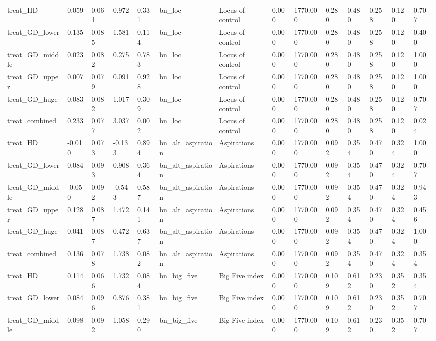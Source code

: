 \begin{tabular}{llllllllllllll}
treat\_HD & 0.059 & 0.061 & 0.972 & 0.331 & bn\_loc & Locus of control & 0.000 & 1770.000 & 0.280 & 0.480 & 0.258 & 0.120 & 0.707 \\
treat\_GD\_lower & 0.135 & 0.085 & 1.581 & 0.114 & bn\_loc & Locus of control & 0.000 & 1770.000 & 0.280 & 0.480 & 0.258 & 0.120 & 0.400 \\
treat\_GD\_middle & 0.023 & 0.082 & 0.275 & 0.783 & bn\_loc & Locus of control & 0.000 & 1770.000 & 0.280 & 0.480 & 0.258 & 0.120 & 1.000 \\
treat\_GD\_upper & 0.007 & 0.079 & 0.091 & 0.928 & bn\_loc & Locus of control & 0.000 & 1770.000 & 0.280 & 0.480 & 0.258 & 0.120 & 1.000 \\
treat\_GD\_huge & 0.083 & 0.082 & 1.017 & 0.309 & bn\_loc & Locus of control & 0.000 & 1770.000 & 0.280 & 0.480 & 0.258 & 0.120 & 0.707 \\
treat\_combined & 0.233 & 0.077 & 3.037 & 0.002 & bn\_loc & Locus of control & 0.000 & 1770.000 & 0.280 & 0.480 & 0.258 & 0.120 & 0.024 \\
treat\_HD & -0.010 & 0.073 & -0.133 & 0.894 & bn\_alt\_aspiration & Aspirations & 0.000 & 1770.000 & 0.092 & 0.354 & 0.470 & 0.324 & 1.000 \\
treat\_GD\_lower & 0.084 & 0.093 & 0.908 & 0.364 & bn\_alt\_aspiration & Aspirations & 0.000 & 1770.000 & 0.092 & 0.354 & 0.470 & 0.324 & 0.707 \\
treat\_GD\_middle & -0.050 & 0.092 & -0.543 & 0.587 & bn\_alt\_aspiration & Aspirations & 0.000 & 1770.000 & 0.092 & 0.354 & 0.470 & 0.324 & 0.943 \\
treat\_GD\_upper & 0.128 & 0.087 & 1.472 & 0.141 & bn\_alt\_aspiration & Aspirations & 0.000 & 1770.000 & 0.092 & 0.354 & 0.470 & 0.324 & 0.456 \\
treat\_GD\_huge & 0.041 & 0.087 & 0.472 & 0.637 & bn\_alt\_aspiration & Aspirations & 0.000 & 1770.000 & 0.092 & 0.354 & 0.470 & 0.324 & 1.000 \\
treat\_combined & 0.136 & 0.078 & 1.738 & 0.082 & bn\_alt\_aspiration & Aspirations & 0.000 & 1770.000 & 0.092 & 0.354 & 0.470 & 0.324 & 0.354 \\
treat\_HD & 0.114 & 0.066 & 1.732 & 0.084 & bn\_big\_five & Big Five index & 0.000 & 1770.000 & 0.109 & 0.612 & 0.230 & 0.352 & 0.354 \\
treat\_GD\_lower & 0.084 & 0.096 & 0.876 & 0.381 & bn\_big\_five & Big Five index & 0.000 & 1770.000 & 0.109 & 0.612 & 0.230 & 0.352 & 0.707 \\
treat\_GD\_middle & 0.098 & 0.092 & 1.058 & 0.290 & bn\_big\_five & Big Five index & 0.000 & 1770.000 & 0.109 & 0.612 & 0.230 & 0.352 & 0.707 \\

\end{tabular}
